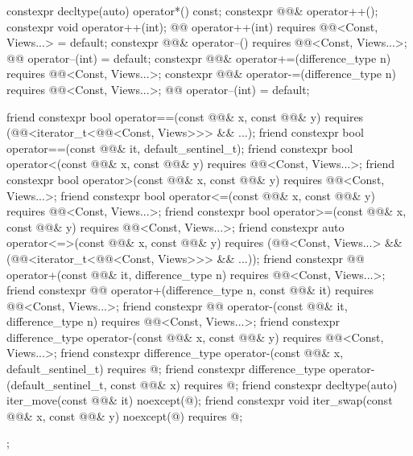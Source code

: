 \begin{codeblock}
{{    constexpr decltype(auto) operator*() const;
    constexpr @@& operator++();
    constexpr void operator++(int);
    @@ operator++(int)
      requires @@<Const, Views...> = default;
    constexpr @@& operator--()
      requires @@<Const, Views...>;
    @@ operator--(int) = default;
    constexpr @@& operator+=(difference_type n)
      requires @@<Const, Views...>;
    constexpr @@& operator-=(difference_type n)
      requires @@<Const, Views...>;
    @@ operator--(int) = default;

    friend constexpr bool operator==(const @@& x, const @@& y)
      requires (@@<iterator_t<@@<Const, Views>>> && ...);
    friend constexpr bool operator==(const @@& it, default_sentinel_t);
    friend constexpr bool operator<(const @@& x, const @@& y)
      requires @@<Const, Views...>;
    friend constexpr bool operator>(const @@& x, const @@& y)
      requires @@<Const, Views...>;
    friend constexpr bool operator<=(const @@& x, const @@& y)
      requires @@<Const, Views...>;
    friend constexpr bool operator>=(const @@& x, const @@& y)
      requires @@<Const, Views...>;
    friend constexpr auto operator<=>(const @@& x, const @@& y)
      requires (@@<Const, Views...> &&
                (@@<iterator_t<@@<Const, Views>>> && ...));
    friend constexpr @@ operator+(const @@& it, difference_type n)
      requires @@<Const, Views...>;
    friend constexpr @@ operator+(difference_type n, const @@& it)
      requires @@<Const, Views...>;
    friend constexpr @@ operator-(const @@& it, difference_type n)
      requires @@<Const, Views...>;
    friend constexpr difference_type operator-(const @@& x, const @@& y)
      requires @@<Const, Views...>;
    friend constexpr difference_type operator-(const @@& x, default_sentinel_t)
      requires @\seebelow@;
    friend constexpr difference_type operator-(default_sentinel_t, const @@& x)
      requires @\seebelow@;
    friend constexpr decltype(auto) iter_move(const @@& it) noexcept(@\seebelow@);
    friend constexpr void iter_swap(const @@& x, const @@& y) noexcept(@\seebelow@)
      requires @\seebelow@;
  };
}
\end{codeblock}


